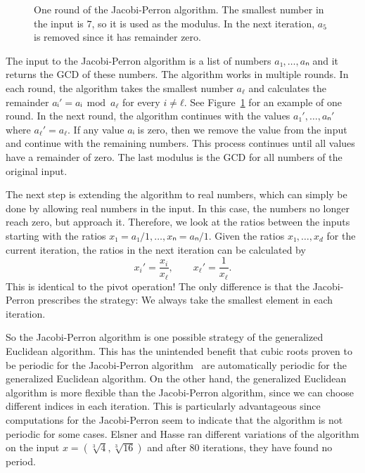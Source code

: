 \begin{figure}[tbp]
  \centering
  
  \caption{
    One round of the Jacobi-Perron algorithm.
    The smallest number in the input is $7$,
    so it is used as the modulus.
    In the next iteration, $a_5$ is removed since it has remainder zero.
  }
  \label{fig:jacobi-perron}
\end{figure}

The input to the Jacobi-Perron algorithm is a list of numbers $a₁, …, aₙ$ and
it returns the GCD of these numbers.
The algorithm works in multiple rounds.
In each round, the algorithm takes the smallest number $a_ℓ$ and calculates the
remainder $aᵢ' = aᵢ \bmod a_ℓ$ for every $i ≠ ℓ$.
See Figure~\ref{fig:jacobi-perron} for an example of one round.
In the next round, the algorithm continues with the values $a₁', …, aₙ'$ where $a_ℓ' = a_ℓ$.
If any value $aᵢ$ is zero, then we remove the value from the input and continue
with the remaining numbers.
This process continues until all values have a remainder of zero.
The last modulus is the GCD for all numbers of the original input.

The next step is extending the algorithm to real numbers,
which can simply be done by allowing real numbers in the input.
In this case, the numbers no longer reach zero, but approach it.
Therefore, we look at the ratios between the inputs starting with the ratios $x₁ = a₁/1, …, xₙ = aₙ/1$.
Given the ratios $x₁, …, x_d$ for the current iteration,
the ratios in the next iteration can be calculated by
\[
  x_i' = \frac{x_i}{x_ℓ}, \qquad x_ℓ' = \frac{1}{x_ℓ}.
\]
This is identical to the pivot operation!
The only difference is that the Jacobi-Perron prescribes the strategy:
We always take the smallest element in each iteration.

So the Jacobi-Perron algorithm is one possible strategy of the generalized
Euclidean algorithm.
This has the unintended benefit that cubic roots proven to be periodic for the
Jacobi-Perron algorithm~\cite{Bernstein64,Bernstein71} are automatically
periodic for the generalized Euclidean algorithm.
On the other hand,
the generalized Euclidean algorithm is more flexible than the Jacobi-Perron
algorithm, since we can choose different indices in each iteration.
This is particularly advantageous since computations for the Jacobi-Perron
seem to indicate that the algorithm is not periodic for some
cases.
Elsner and Hasse \cite{Elsner67} ran different variations of the algorithm on
the input $x = (\sqrt[3]{4}, \sqrt[3]{16})$ and after 80 iterations, they have
found no period.
\fi
